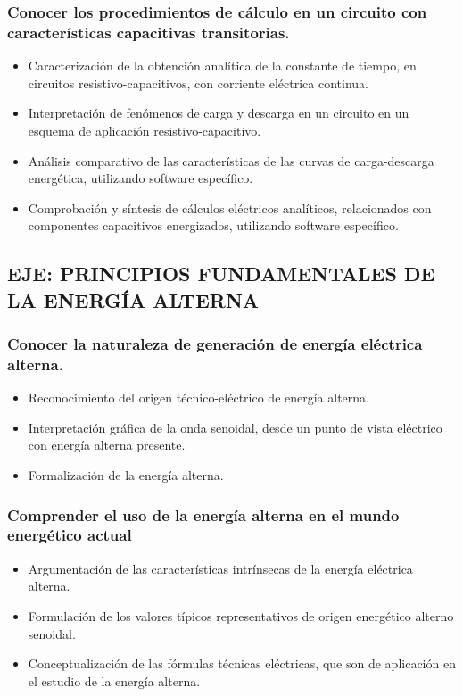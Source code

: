 \documentclass[../main]{subfiles}
\begin{document}
\subsubsection{Conocer los
procedimientos de cálculo
en un circuito con
características capacitivas
transitorias.}
\begin{itemize}
\item  Caracterización de la obtención analítica de la constante
de tiempo, en circuitos resistivo-capacitivos, con corriente
eléctrica continua.
\item Interpretación de fenómenos de carga y descarga en un
circuito en un esquema de aplicación resistivo-capacitivo.
\item Análisis comparativo de las características de las curvas
de carga-descarga energética, utilizando software
específico.
\item Comprobación y síntesis de cálculos eléctricos analíticos,
relacionados con componentes capacitivos energizados,
utilizando software específico. 

\end{itemize}

 \subsection{EJE: PRINCIPIOS FUNDAMENTALES DE LA ENERGÍA ALTERNA}
 \subsubsection{Conocer la naturaleza de
generación de energía
eléctrica alterna. }
\begin{itemize}
    \item  Reconocimiento del origen técnico-eléctrico de energía
alterna.
\item Interpretación gráfica de la onda senoidal, desde un punto
de vista eléctrico con energía alterna presente.
\item Formalización de la energía alterna. 
\end{itemize}
\subsubsection{Comprender el uso de la
energía alterna en el
mundo energético actual}
\begin{itemize}
\item Argumentación de las características intrínsecas de la
energía eléctrica alterna.
\item Formulación de los valores típicos representativos de
origen energético alterno senoidal.
\item Conceptualización de las fórmulas técnicas eléctricas, que
son de aplicación en el estudio de la energía alterna. 
\end{itemize}
\end{document}
